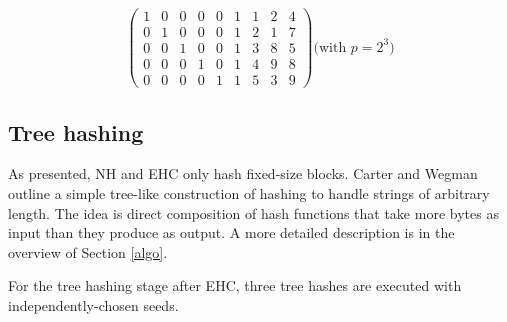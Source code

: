 \documentclass[runningheads]{llncs}
\begin{document}
\[
\left(
\begin{array}{rrrrrrrrr}
 1 & 0 & 0 & 0 & 0 & 1 & 1 & 2 & 4\\
 0 & 1 & 0 & 0 & 0 & 1 & 2 & 1 & 7\\
 0 & 0 & 1 & 0 & 0 & 1 & 3 & 8 & 5\\
 0 & 0 & 0 & 1 & 0 & 1 & 4 & 9 & 8\\
 0 & 0 & 0 & 0 & 1 & 1 & 5 & 3 & 9
\end{array}
\right)
\textrm{(with $p = 2^3$)}
\]


\subsection{Tree hashing}

As presented, NH and EHC only hash fixed-size blocks.
Carter and Wegman outline a simple tree-like construction of hashing to handle strings of arbitrary length. \cite{badger,carter-wegman-79}
The idea is direct composition of hash functions that take more bytes as input than they produce as output.
A more detailed description is in the overview of Section \ref{algo}.

For the tree hashing stage after EHC, three tree hashes are executed with independently-chosen seeds.







\end{document}
